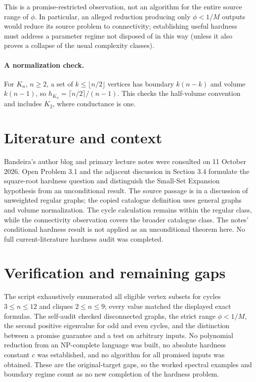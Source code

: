 \documentclass[11pt,a4paper]{article}
\begin{document}
This is a promise-restricted observation, not an algorithm for the entire source range of $\phi$. In particular, an alleged reduction producing only $\phi<1/M$ outputs would reduce its source problem to connectivity; establishing useful hardness must address a parameter regime not disposed of in this way (unless it also proves a collapse of the usual complexity classes).

\paragraph{A normalization check.}
For $K_n$, $n\ge2$, a set of $k\le\lfloor n/2\rfloor$ vertices has boundary $k(n-k)$ and volume $k(n-1)$, so $h_{K_n}=\lceil n/2\rceil/(n-1)$. This checks the half-volume convention and includes $K_2$, where conductance is one.

\section{Literature and context}
Bandeira's author blog and primary lecture notes were consulted on 11 October 2026. Open Problem 3.1 and the adjacent discussion in Section 3.4 formulate the square-root hardness question and distinguish the Small-Set Expansion hypothesis from an unconditional result. The source passage is in a discussion of unweighted regular graphs; the copied catalogue definition uses general graphs and volume normalization. The cycle calculation remains within the regular class, while the connectivity observation covers the broader catalogue class. The notes' conditional hardness result is not applied as an unconditional theorem here. No full current-literature hardness audit was completed.

\section{Verification and remaining gaps}
The script exhaustively enumerated all eligible vertex subsets for cycles $3\le n\le12$ and cliques $2\le n\le9$; every value matched the displayed exact formulas. The self-audit checked disconnected graphs, the strict range $\phi<1/M$, the second positive eigenvalue for odd and even cycles, and the distinction between a promise guarantee and a test on arbitrary inputs. No polynomial reduction from an NP-complete language was built, no absolute hardness constant $c$ was established, and no algorithm for all promised inputs was obtained. These are the original-target gaps, so the worked spectral examples and boundary regime count as no new completion of the hardness problem.
\end{document}
